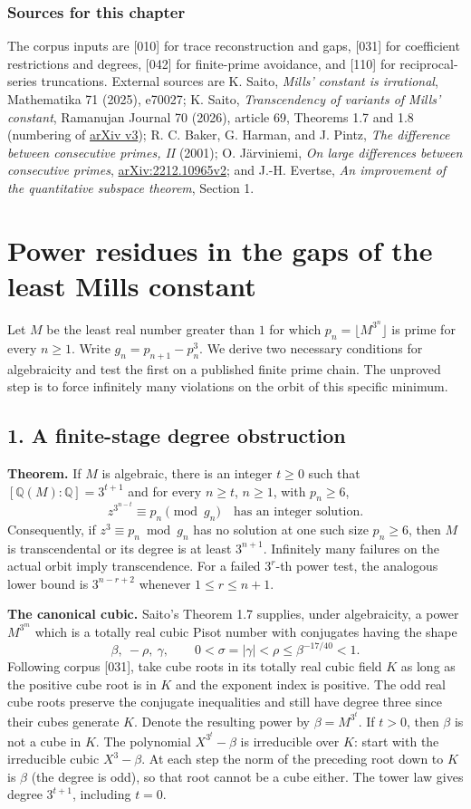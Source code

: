 \documentclass[11pt,a4paper,oneside,openany]{book}
\newcommand{\Q}{\mathbb Q}\newcommand{\C}{\mathbb C}\newcommand{\Z}{\mathbb Z}\newcommand{\F}{\mathbb F}\newcommand{\Tr}{\operatorname{Tr}}\newcommand{\Nm}{\operatorname{N}}\newcommand{\ord}{\operatorname{ord}}\newcommand{\K}{K}\newcommand{\OO}{\mathcal O_K}\newcommand{\unit}{\mathcal U}
\newcommand{\sub}[1]{\par\medskip\textbf{#1}\enspace}
\newcommand{\localhead}[1]{\needspace{5\baselineskip}\section*{\color{ink}#1}}
\let\sect\localhead\let\secx\localhead\let\head\localhead
\begin{document}
\subsection*{Sources for this chapter}
The corpus inputs are [010] for trace reconstruction and gaps, [031] for coefficient restrictions and degrees, [042] for finite-prime avoidance, and [110] for reciprocal-series truncations. External sources are K. Saito, \emph{Mills' constant is irrational}, Mathematika 71 (2025), e70027; K. Saito, \emph{Transcendency of variants of Mills' constant}, Ramanujan Journal 70 (2026), article 69, Theorems 1.7 and 1.8 (numbering of \href{https://arxiv.org/abs/2508.16068v3}{arXiv v3}); R. C. Baker, G. Harman, and J. Pintz, \emph{The difference between consecutive primes, II} (2001); O. J\"arviniemi, \emph{On large differences between consecutive primes}, \href{https://arxiv.org/abs/2212.10965v2}{arXiv:2212.10965v2}; and J.-H. Evertse, \emph{An improvement of the quantitative subspace theorem}, Section 1.


\chapter{Power residues in the gaps of the least Mills constant}\label{ch:gaps}
Let $M$ be the least real number greater than $1$ for which $p_n=\lfloor M^{3^n}\rfloor$ is prime for every $n\ge1$. Write $g_n=p_{n+1}-p_n^3$. We derive two necessary conditions for algebraicity and test the first on a published finite prime chain. The unproved step is to force infinitely many violations on the orbit of this specific minimum.

\sect{1. A finite-stage degree obstruction}
\textbf{Theorem.} If $M$ is algebraic, there is an integer $t\ge0$ such that $[\Q(M):\Q]=3^{t+1}$ and for every $n\ge t$, $n\ge1$, with $p_n\ge6$,
\[
 \boxed{\quad z^{3^{n-t}}\equiv p_n\pmod{g_n}
              \quad\text{has an integer solution.}\quad}
\]
Consequently, if $z^3\equiv p_n\bmod g_n$ has no solution at one such size $p_n\ge6$, then $M$ is transcendental or its degree is at least $3^{n+1}$. Infinitely many failures on the actual orbit imply transcendence. For a failed $3^r$-th power test, the analogous lower bound is $3^{n-r+2}$ whenever $1\le r\le n+1$.

\sub{The canonical cubic.}
Saito's Theorem 1.7 supplies, under algebraicity, a power $M^{3^m}$ which is a totally real cubic Pisot number with conjugates having the shape
\[
 \beta,\ -\rho,\ \gamma,\qquad
 0<\sigma=|\gamma|<\rho\le\beta^{-17/40}<1.
\]
Following corpus [031], take cube roots in its totally real cubic field $K$ as long as the positive cube root is in $K$ and the exponent index is positive. The odd real cube roots preserve the conjugate inequalities and still have degree three since their cubes generate $K$. Denote the resulting power by $\beta=M^{3^t}$. If $t>0$, then $\beta$ is not a cube in $K$. The polynomial $X^{3^t}-\beta$ is irreducible over $K$: start with the irreducible cubic $X^3-\beta$. At each step the norm of the preceding root down to $K$ is $\beta$ (the degree is odd), so that root cannot be a cube either. The tower law gives degree $3^{t+1}$, including $t=0$.
\end{document}

